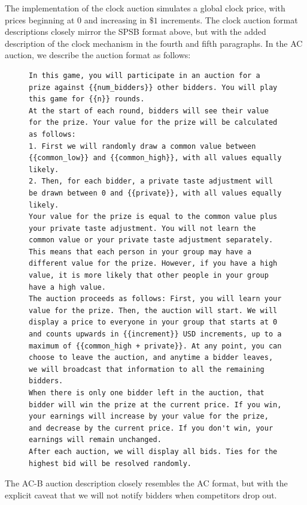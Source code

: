 \documentclass[acmsmall,screen,review]{acmart}
\begin{document}
The implementation of the clock auction simulates a global clock price, with prices beginning at $0$ and increasing in $\$1$ increments. The clock auction format descriptions closely mirror the SPSB format above, but with the added description of the clock mechanism in the fourth and fifth paragraphs.
In the AC auction, we describe the auction format as follows:
\begin{figure}
\centering
\begin{minipage}{0.95\textwidth}
\begin{lstlisting}
In this game, you will participate in an auction for a prize against {{num_bidders}} other bidders. You will play this game for {{n}} rounds.
At the start of each round, bidders will see their value for the prize. Your value for the prize will be calculated as follows:
1. First we will randomly draw a common value between {{common_low}} and {{common_high}}, with all values equally likely.
2. Then, for each bidder, a private taste adjustment will be drawn between 0 and {{private}}, with all values equally likely.
Your value for the prize is equal to the common value plus your private taste adjustment. You will not learn the common value or your private taste adjustment separately. This means that each person in your group may have a different value for the prize. However, if you have a high value, it is more likely that other people in your group have a high value.
The auction proceeds as follows: First, you will learn your value for the prize. Then, the auction will start. We will display a price to everyone in your group that starts at 0 and counts upwards in {{increment}} USD increments, up to a maximum of {{common_high + private}}. At any point, you can choose to leave the auction, and anytime a bidder leaves, we will broadcast that information to all the remaining bidders.
When there is only one bidder left in the auction, that bidder will win the prize at the current price. If you win, your earnings will increase by your value for the prize, and decrease by the current price. If you don't win, your earnings will remain unchanged.
After each auction, we will display all bids. Ties for the highest bid will be resolved randomly.
\end{lstlisting}
\end{minipage}
\label{fig:sealbid_prompt-5}
\end{figure}

The AC-B auction description closely resembles the AC format, but with the explicit caveat that we will not notify bidders when competitors drop out.
\end{document}
